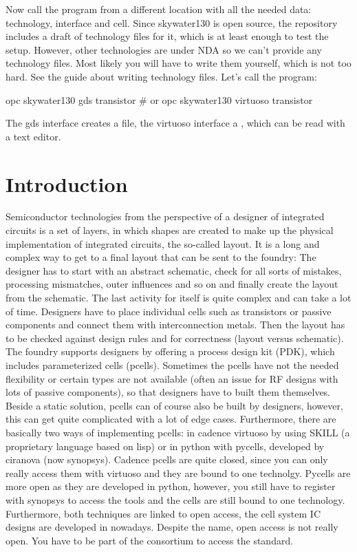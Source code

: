 Now call the program from a different location with all the needed data: technology, interface and cell. Since skywater130 is open source, the repository includes a
draft of technology files for it, which is at least enough to test the setup. However, other technologies are under NDA so we can't provide any technology files.
Most likely you will have to write them yourself, which is not too hard. See the guide about writing technology files. Let's call the program:
\begin{shell}
    opc skywater130 gds transistor
    # or
    opc skywater130 virtuoso transistor
\end{shell}
The gds interface creates a  file, the virtuoso interface a , which can be read with a text editor.

\section{Introduction}
Semiconductor technologies from the perspective of a designer of integrated circuits is a set of layers, in which shapes are created to make up the physical
implementation of integrated circuits, the so-called layout. It is a long and complex way to get to a final layout that can be sent to the foundry: The designer has
to start with an abstract schematic, check for all sorts of mistakes, processing mismatches, outer influences and so on and finally create the layout from the
schematic. The last activity for itself is quite complex and can take a lot of time. Designers have to place individual cells such as transistors or passive
components and connect them with interconnection metals. Then the layout has to be checked against design rules and for correctness (layout versus schematic).
The foundry supports designers by offering a process design kit (PDK), which includes parameterized cells (pcells). Sometimes the pcells have not the needed
flexibility or certain types are not available (often an issue for RF designs with lots of passive components), so that designers have to built them themselves.
Beside a static solution, pcells can of course also be built by designers, however, this can get quite complicated with a lot of edge cases. Furthermore, there are
basically two ways of implementing pcells: in cadence virtuoso by using SKILL (a proprietary language based on lisp) or in python with pycells, developed by ciranova
(now synopsys). Cadence pcells are quite closed, since you can only really access them with virtuoso and they are bound to one technolgy. Pycells are more open as
they are developed in python, however, you still have to register with synopsys to access the tools and the cells are still bound to one technology. Furthermore,
both techniques are linked to open access, the cell system IC designs are developed in nowadays. Despite the name, open access is not really open. You have to be
part of the consortium to access the standard.

